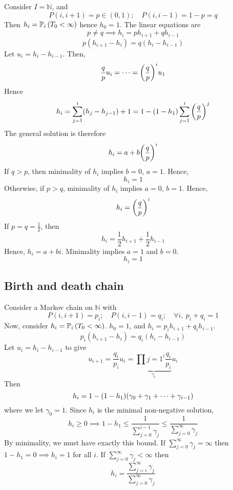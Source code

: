 \begin{example}
	Consider \( I = \mathbb N \), and
	\[
		P(i, i+1) = p \in (0,1);\quad P(i, i-1) = 1-p = q
	\]
	Then \( h_i = \mathbb{P}_{i}\left({T_0 < \infty}\right) \) hence \( h_0 = 1 \).
	The linear equations are
	\[
		p \neq q \implies h_i = p h_{i+1} + q h_{i-1}
	\]
	\[
		p(h_{i+1} - h_i) = q(h_i - h_{i-1})
	\]
	Let \( u_i = h_i - h_{i-1} \).
	Then,
	\[
		\frac{q}{p} u_i = \dots = \qty(\frac{q}{p})^i u_1
	\]
	Hence
	\[
		h_i = \sum_{j=1}^i (h_j - h_{j-1}) + 1 = 1 - (1-h_1) \sum_{j=1}^i \qty(\frac{q}{p})^j
	\]
	The general solution is therefore
	\[
		h_i = a + b \qty(\frac{q}{p})^i
	\]
	If \( q > p \), then minimality of \( h_i \) implies \( b = 0 \), \( a = 1 \).
	Hence,
	\[
		h_i = 1
	\]
	Otherwise, if \( p > q \), minimality of \( h_i \) implies \( a = 0 \), \( b = 1 \).
	Hence,
	\[
		h_i = \qty(\frac{q}{p})^i
	\]
	If \( p = q = \frac{1}{2} \), then
	\[
		h_i = \frac{1}{2} h_{i+1} + \frac{1}{2} h_{i-1}
	\]
	Hence, \( h_i = a + bi \).
	Minimality implies \( a = 1 \) and \( b = 0 \).
	\[
		h_i = 1
	\]
\end{example}

\subsection{Birth and death chain}
Consider a Markov chain on \( \mathbb N \) with
\[
	P(i,i+1) = p_i;\quad P(i,i-1) = q_i;\quad \forall i,\ p_i + q_i = 1
\]
Now, consider \( h_i = \mathbb{P}_{i}\left({T_0 < \infty}\right) \).
\( h_0 = 1 \), and \( h_i = p_i h_{i+1} + q_i h_{i-1} \).
\[
	p_i (h_{i+1} - h_i) = q_i (h_i - h_{i-1})
\]
Let \( u_i = h_i - h_{i-1} \) to give
\[
	u_{i+1} = \frac{q_i}{p_i} u_i = \underbrace{\prod{j=1}^i \frac{q_i}{p_i}}_{\gamma_i} u_i
\]
Then
\[
	h_i = 1 - (1 - h_1) \qty( \gamma_0 + \gamma_1 + \dots + \gamma_{i-1} )
\]
where we let \( \gamma_0 = 1 \).
Since \( h_i \) is the minimal non-negative solution,
\[
	h_i \geq 0 \implies 1 - h_1 \leq \frac{1}{\sum_{j=0}^{i-1} \gamma_j} \leq \frac{1}{\sum_{j=0}^{\infty} \gamma_j}
\]
By minimality, we must have exactly this bound.
If \( \sum_{j=0}^\infty \gamma_j = \infty \) then \( 1 - h_1 = 0 \implies h_i = 1 \) for all \( i \).
If \( \sum_{j=0}^\infty \gamma_j < \infty \) then
\[
	h_i = \frac{\sum_{j=i}^\infty \gamma_j}{\sum_{j=0}^\infty \gamma_j}
\]


